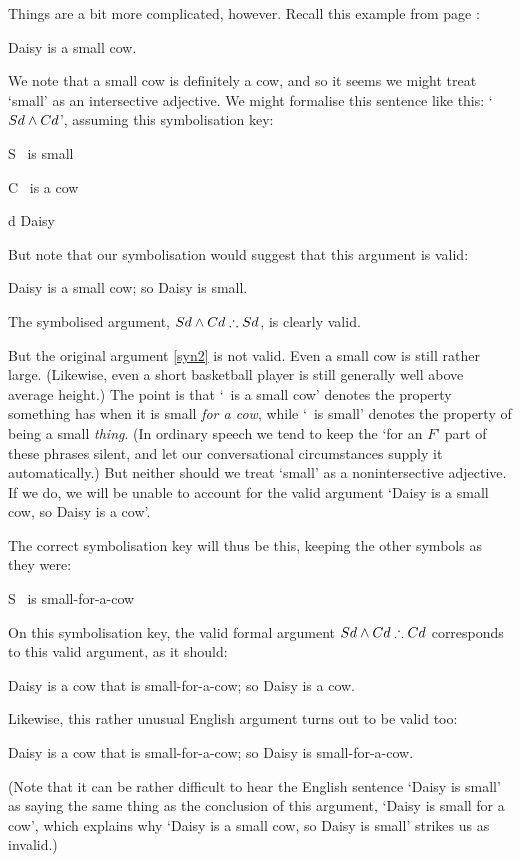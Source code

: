 Things are a bit more complicated, however. Recall this example from page \pageref{daisy}:
\begin{earg}
	\item[] Daisy is a small cow.
\end{earg} We note that a small cow is definitely a cow, and so it seems we might treat `small' as an intersective adjective. We might formalise this sentence like this: `$Sd \wedge Cd$', assuming this symbolisation key:
	\begin{ekey}
		\item[S] \blank\ is small
		\item[C] \blank\ is a cow
		\item[d] Daisy
	\end{ekey}
But note that our symbolisation would suggest that this argument is valid: \begin{earg}
	\item[\ex{syn2}] Daisy is a small cow; so Daisy is small.
\end{earg} The symbolised argument, $Sd \wedge Cd \mathrel{\therefore} Sd$, is clearly valid.

But the original argument \ref{syn2} is not valid. Even a small cow is still rather large. (Likewise, even a short basketball player is still generally well above average height.) The point is that `\blank\ is a small cow' denotes the property something has when it is small \emph{for a cow}, while `\blank\ is small' denotes the property of being a small \emph{thing}. (In ordinary speech we tend to keep the  `for an $F$' part of these phrases silent, and let our conversational circumstances supply it automatically.) But neither should we treat `small' as a nonintersective adjective. If we do, we will be unable to account for the valid argument `Daisy is a small cow, so Daisy is a cow'. 

The correct symbolisation key will thus be this, keeping the other symbols as they were: 
	\begin{ekey}
		\item[S] \blank\ is small-for-a-cow
	\end{ekey} On this symbolisation key, the valid formal argument $Sd \wedge Cd \mathrel{\therefore} Cd$ corresponds to this valid argument, as it should:
	\begin{earg}
		\item[] Daisy is a cow that is small-for-a-cow; so Daisy is a cow.
	\end{earg} 
Likewise, this rather unusual English argument turns out to be valid too: \begin{earg}
		\item[] Daisy is a cow that is small-for-a-cow; so Daisy is small-for-a-cow.
	\end{earg} (Note that it can be rather difficult to hear the English sentence `Daisy is small' as saying the same thing as the conclusion of this argument, `Daisy is small for a cow', which explains why `Daisy is a small cow, so Daisy is small' strikes us as invalid.)

